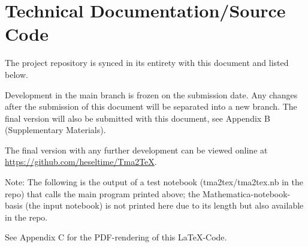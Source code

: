 \chapter{Technical Documentation/Source Code}
\label{app:Source}


The project repository is synced in its entirety with this document and listed below. 

Development in the main branch is frozen on the submission date. Any changes after the submission of this document will be separated into a new branch. The final version will also be submitted with this document, see Appendix B (Supplementary Materials).


The final version with any further development can be viewed online at \url{https://github.com/heseltime/Tma2TeX}.


%

%

Note: The following is the output of a test notebook (tma2tex/tma2tex.nb in the repo) that calls the main program printed above; the Mathematica-notebook-basis (the input notebook) is not printed here due to its length but also available in the repo.



See Appendix C for the PDF-rendering of this LaTeX-Code.